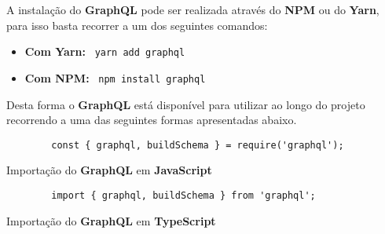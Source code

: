 A instalação do \textbf{GraphQL} pode ser realizada através do \textbf{NPM} ou do \textbf{Yarn}, para isso basta recorrer a um dos seguintes comandos:

\begin{itemize}
	\item \textbf{Com Yarn:} ~\texttt{yarn add graphql}
	\item \textbf{Com NPM:} ~\texttt{npm install graphql}
\end{itemize}

Desta forma o \textbf{GraphQL} está disponível para utilizar ao longo do projeto recorrendo a uma das seguintes formas apresentadas abaixo.

\begin{longlisting}
	\begin{verbatim}
		const { graphql, buildSchema } = require('graphql');
	\end{verbatim}

	\caption{Importação do \textbf{GraphQL} em \textbf{JavaScript}}
\end{longlisting}

\begin{longlisting}
	\begin{verbatim}
		import { graphql, buildSchema } from 'graphql';
	\end{verbatim}

	\caption{Importação do \textbf{GraphQL} em \textbf{TypeScript}}
\end{longlisting}